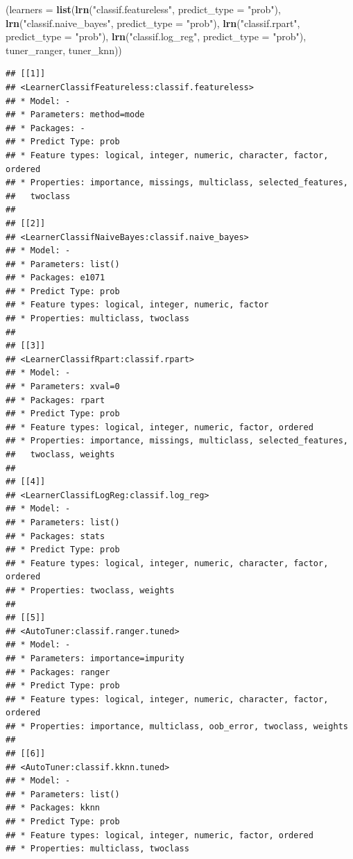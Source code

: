 \documentclass[
]{article}
\newenvironment{Shaded}{\begin{snugshade}}{\end{snugshade}}
\newcommand{\DataTypeTok}[1]{\textcolor[rgb]{0.13,0.29,0.53}{#1}}
\newcommand{\KeywordTok}[1]{\textcolor[rgb]{0.13,0.29,0.53}{\textbf{#1}}}
\newcommand{\NormalTok}[1]{#1}
\newcommand{\StringTok}[1]{\textcolor[rgb]{0.31,0.60,0.02}{#1}}
\begin{document}
\begin{Shaded}
\begin{Highlighting}[]
\NormalTok{(}\DataTypeTok{learners =} \KeywordTok{list}\NormalTok{(}\KeywordTok{lrn}\NormalTok{(}\StringTok{"classif.featureless"}\NormalTok{, }\DataTypeTok{predict_type =} \StringTok{"prob"}\NormalTok{),}
                \KeywordTok{lrn}\NormalTok{(}\StringTok{"classif.naive_bayes"}\NormalTok{, }\DataTypeTok{predict_type =} \StringTok{"prob"}\NormalTok{),}
                \KeywordTok{lrn}\NormalTok{(}\StringTok{"classif.rpart"}\NormalTok{, }\DataTypeTok{predict_type =} \StringTok{"prob"}\NormalTok{),}
                \KeywordTok{lrn}\NormalTok{(}\StringTok{"classif.log_reg"}\NormalTok{, }\DataTypeTok{predict_type =} \StringTok{"prob"}\NormalTok{),}
\NormalTok{                tuner_ranger,}
\NormalTok{                tuner_knn))}
\end{Highlighting}
\end{Shaded}

\begin{verbatim}
## [[1]]
## <LearnerClassifFeatureless:classif.featureless>
## * Model: -
## * Parameters: method=mode
## * Packages: -
## * Predict Type: prob
## * Feature types: logical, integer, numeric, character, factor, ordered
## * Properties: importance, missings, multiclass, selected_features,
##   twoclass
## 
## [[2]]
## <LearnerClassifNaiveBayes:classif.naive_bayes>
## * Model: -
## * Parameters: list()
## * Packages: e1071
## * Predict Type: prob
## * Feature types: logical, integer, numeric, factor
## * Properties: multiclass, twoclass
## 
## [[3]]
## <LearnerClassifRpart:classif.rpart>
## * Model: -
## * Parameters: xval=0
## * Packages: rpart
## * Predict Type: prob
## * Feature types: logical, integer, numeric, factor, ordered
## * Properties: importance, missings, multiclass, selected_features,
##   twoclass, weights
## 
## [[4]]
## <LearnerClassifLogReg:classif.log_reg>
## * Model: -
## * Parameters: list()
## * Packages: stats
## * Predict Type: prob
## * Feature types: logical, integer, numeric, character, factor, ordered
## * Properties: twoclass, weights
## 
## [[5]]
## <AutoTuner:classif.ranger.tuned>
## * Model: -
## * Parameters: importance=impurity
## * Packages: ranger
## * Predict Type: prob
## * Feature types: logical, integer, numeric, character, factor, ordered
## * Properties: importance, multiclass, oob_error, twoclass, weights
## 
## [[6]]
## <AutoTuner:classif.kknn.tuned>
## * Model: -
## * Parameters: list()
## * Packages: kknn
## * Predict Type: prob
## * Feature types: logical, integer, numeric, factor, ordered
## * Properties: multiclass, twoclass
\end{verbatim}
\end{document}
